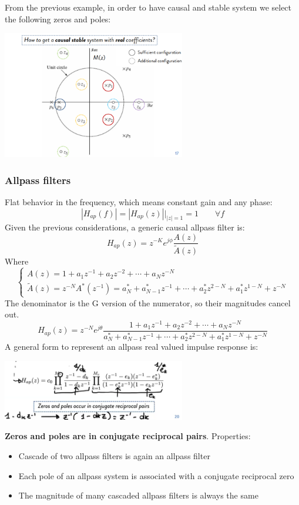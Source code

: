 From the previous example, in order to have causal and stable system we select the following zeros and poles:
\begin{center}
    \includegraphics[width=0.6\textwidth]{images/magnitued_square2.png}
\end{center}

\subsubsection{Allpass filters}
Flat behavior in the frequency, which means constant gain and any phase:
$$
|H_{ap}(f)|=|H_{ap}(z)|\big|_{|z|=1}=1\qquad\forall f
$$
Given the previous considerations, a generic causal allpass filter is:
$$
H_{ap}(z)=z^{-K}e^{j\phi}\frac{A(z)}{\tilde{A}(z)}
$$
Where
$$
\begin{cases}
    A(z)=1+a_1z^{-1}+a_2z^{-2}+\cdots+a_Nz^{-N}\\
    \tilde{A}(z)=z^{-N}A^*(z^{-1})=a^*_N+a_{N-1}^*z^{-1}+\cdots+a_2^*z^{2-N}+a_1^*z^{1-N}+z^{-N}
\end{cases}
$$
The denominator is the G version of the numerator, so their magnitudes cancel out.
$$
H_{ap}(z)=z^{-N}e^{j\theta}
\frac{
    1+a_1z^{-1}+a_2z^{-2}+\cdots+a_Nz^{-N}
}{
    a^*_N+a_{N-1}^*z^{-1}+\cdots+a_2^*z^{2-N}+a_1^*z^{1-N}+z^{-N}
}
$$
A general form to represent an allpass real valued impulse response is:
\begin{center}
    \includegraphics[width=0.6\textwidth]{images/allpass.png}
\end{center}
\textbf{Zeros and poles are in conjugate reciprocal pairs}.
Properties:
\begin{itemize}
    \item Cascade of two allpass filters is again an allpass filter
    \item Each pole of an allpass system is associated with a conjugate reciprocal zero
    \item The magnitude of many cascaded allpass filters is always the same
\end{itemize}